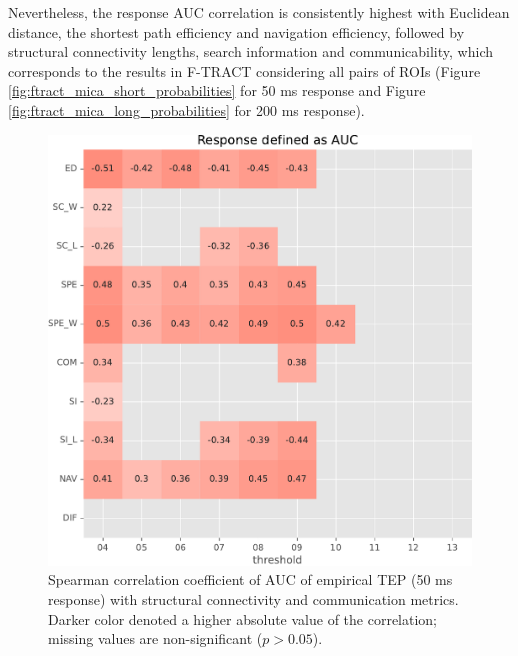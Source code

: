 Nevertheless, the response AUC correlation is consistently highest with Euclidean distance, the shortest path efficiency and navigation efficiency, followed by structural connectivity lengths, search information and communicability, which corresponds to the results in F-TRACT considering all pairs of ROIs (Figure \ref{fig:ftract_mica_short_probabilities} for 50 ms response and Figure \ref{fig:ftract_mica_long_probabilities} for 200 ms response).

\begin{figure}
    \centering
    \includegraphics[width=\textwidth]{images/nootebook_generated/pytepfit_results/empirical/50/not_over_threshold_nan/Response defined as AUC.pdf}
    \caption[TEPs AUC (50 ms) correlation with SC and communication metrics]{Spearman correlation coefficient of AUC of empirical TEP (50 ms response) with structural connectivity and communication metrics. Darker color denoted a higher absolute value of the correlation; missing values are non-significant ($p>0.05$).}
    \label{fig:tms_auc_50}
\end{figure}

